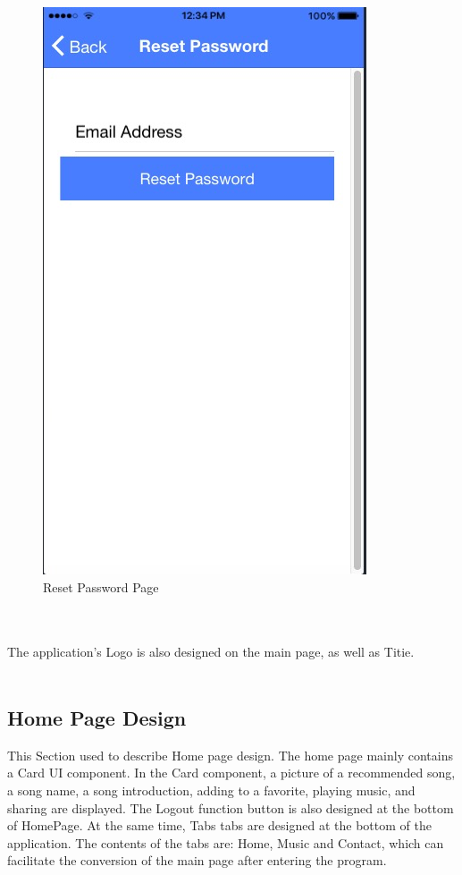\begin{figure}[h]
	\centering
	\includegraphics[scale=0.5]{img/ResetPassword.png}
	\caption{Reset Password Page}
	\label{fig:6.6.4 cubed graph}
\end{figure}
\\ \\ The application's Logo is also designed on the main page, as well as Titie.
\\
\\ \subsection{Home Page Design}
This Section used to describe Home page design. The home page mainly contains a Card UI component. In the Card component, a picture of a recommended song, a song name, a song introduction, adding to a favorite, playing music, and sharing are displayed. The Logout function button is also designed at the bottom of HomePage. At the same time, Tabs tabs are designed at the bottom of the application. The contents of the tabs are: Home, Music and Contact, which can facilitate the conversion of the main page after entering the program.
